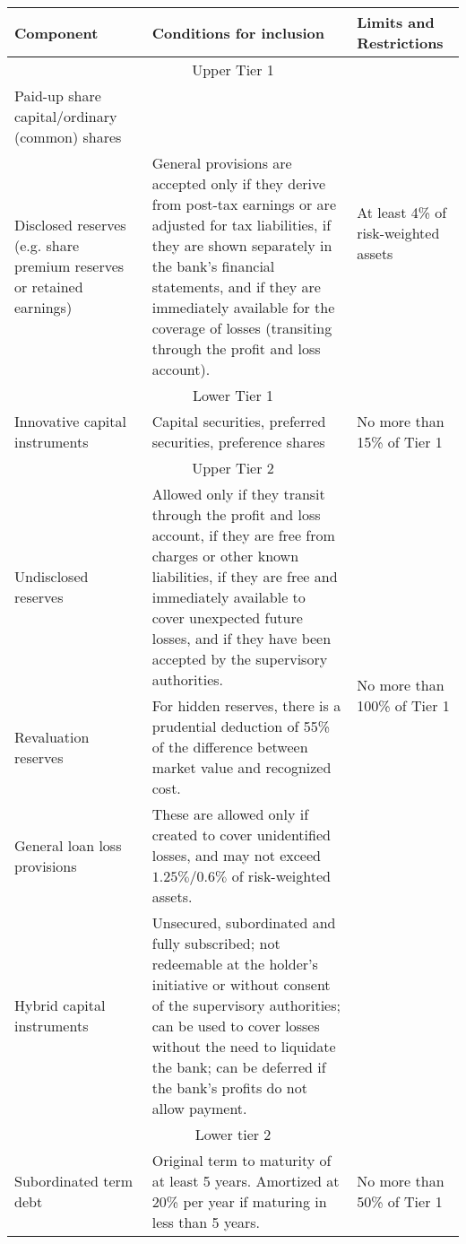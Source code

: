 \documentclass[12pt]{article} 
\begin{document}
\begin{table}
\begin{tabular}{|p{3cm}|p{8cm}|p{3cm}|}
    \toprule
    \textbf{Component} & \textbf{Conditions for inclusion} & \textbf{Limits and Restrictions} \\
    \midrule
    \multicolumn{3}{|c|}{Upper Tier 1} \\
    \hline
    Paid-up share capital/ordinary (common) shares &  & \multirow{2}{3cm}{At least 4\% of risk-weighted assets} \\ \cline{1-2}
    Disclosed reserves (e.g. share premium reserves or retained earnings) & General provisions are accepted only if they derive from post-tax earnings or are adjusted for tax liabilities, if they are shown separately in the bank’s financial statements, and if they are immediately available for the coverage of losses (transiting through the profit and loss account). & \\
    \hline
    \multicolumn{3}{|c|}{Lower Tier 1} \\
    \hline
    Innovative capital instruments & Capital securities, preferred securities, preference shares & No more than 15\% of Tier 1 \\
    \hline
    \multicolumn{3}{|c|}{Upper Tier 2} \\
    \hline
    Undisclosed reserves & Allowed only if they transit through the profit and loss account, if they are free from charges or other known liabilities, if they are free and immediately available to cover unexpected future losses, and if they have been accepted by the supervisory authorities. & \multirow{3}{3cm}{No more than 100\% of Tier 1} \\ \cline{1-2}
    Revaluation reserves & For hidden reserves, there is a prudential deduction of 55\% of the difference between market value and recognized cost. & \\ \cline{1-2}
    General loan loss provisions & These are allowed only if created to cover unidentified losses, and may not exceed \(1.25\%/0.6\%\) of risk-weighted assets. & \\ \hline
    Hybrid capital instruments & Unsecured, subordinated and fully subscribed; not redeemable at the holder’s initiative or without consent of the supervisory authorities; can be used to cover losses without the need to liquidate the bank; can be deferred if the bank’s profits do not allow payment. & \\
    \hline
    \multicolumn{3}{|c|}{Lower tier 2} \\
    \hline
    Subordinated term debt & Original term to maturity of at least 5 years. Amortized at 20\% per year if maturing in less than 5 years. & No more than 50\% of Tier 1 \\
    \bottomrule
  \end{tabular}
\end{table}

\FloatBarrier  
\end{document}
